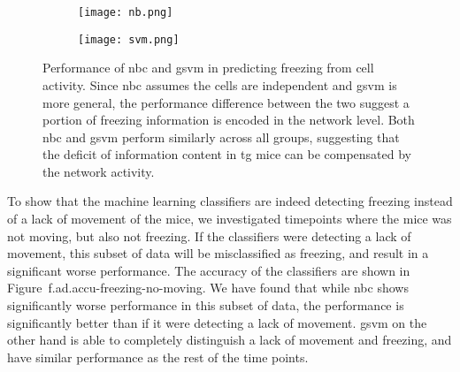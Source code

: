 \begin{figure}[h]
    \begin{subfigure}[h]{\textwidth}
        \texttt{[image: nb.png]}
        \caption{\label{f.ad.nb}}
    \end{subfigure}
    \begin{subfigure}[h]{\textwidth}
        \texttt{[image: svm.png]}
        \caption{\label{f.ad.svm}}
    \end{subfigure}
    \caption[Accuracy of machine learning classifier in predicting freezing.]{Performance of  \gls{nbc} and  \gls{gsvm} in predicting freezing from cell activity. Since \gls{nbc} assumes the cells are independent and \gls{gsvm} is more general, the performance difference between the two suggest a portion of freezing information is encoded in the network level. Both \gls{nbc} and \gls{gsvm} perform similarly across all groups, suggesting that the deficit of information content in \gls{tg} mice can be compensated by the network activity. \label{f.ad.classifier}}
\end{figure}

To show that the machine learning classifiers are indeed detecting freezing instead of a lack of movement of the mice, we investigated timepoints where the mice was not moving, but also not freezing. If the classifiers were detecting a lack of movement, this subset of data will be misclassified as freezing, and result in a significant worse performance. The accuracy of the classifiers are shown in Figure~{f.ad.accu-freezing-no-moving}. We have found that while \gls{nbc} shows significantly worse performance in this subset of data, the performance is significantly better than if it were detecting a lack of movement. \Gls{gsvm} on the other hand is able to completely distinguish a lack of movement and freezing, and have similar performance as the rest of the time points. 

